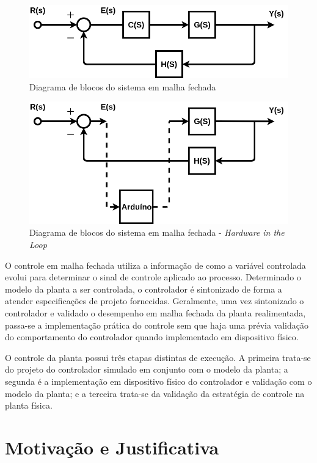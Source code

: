 \begin{figure}[ht]
  \centering
  \includegraphics[width = 0.6\columnwidth]{Imagens/blocosMF.png}
  \caption{Diagrama de blocos do sistema em malha fechada}
  \label{fig:diagBloco} 
\end{figure}

\begin{figure}[ht]
  \centering
  \includegraphics[width = 0.7\columnwidth]{Imagens/blocoHard.png}
  \caption{Diagrama de blocos do sistema em malha fechada - \emph{Hardware in the Loop}}
  \label{fig:diagBlocoHIL} 
\end{figure}


O controle em malha fechada utiliza a informação de como a variável controlada evolui 
para determinar o sinal de controle aplicado ao processo. Determinado o modelo da 
planta a ser controlada, o controlador é sintonizado de forma a atender especificações 
de projeto fornecidas. Geralmente, 
uma vez sintonizado o controlador e validado o desempenho em malha fechada da 
planta realimentada, passa-se a implementação prática do controle sem que haja 
uma prévia validação do comportamento do controlador quando implementado em 
dispositivo físico. 

O controle da planta possui três etapas distintas de execução. A primeira trata-se 
do projeto do controlador simulado em conjunto com o modelo da planta; a segunda 
é a implementação em dispositivo físico do controlador e validação com 
o modelo da planta; e a terceira trata-se da validação da estratégia de controle 
na planta física.

\section{Motivação e Justificativa}

